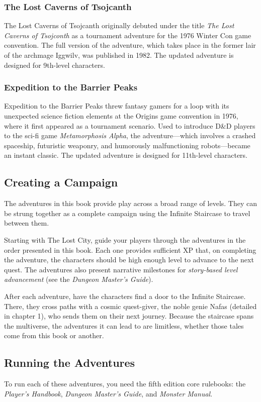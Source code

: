 \documentclass[10pt,a4paper,twoside,bg=print,twocolumn,openany,nodeprecatedcode]{dndbook}
\begin{document}
\subsubsection{The Lost Caverns of Tsojcanth}
The Lost Caverns of Tsojcanth originally debuted under the title \textit{The Lost Caverns of Tsojconth} as a tournament adventure for the 1976 Winter Con game convention. The full version of the adventure, which takes place in the former lair of the archmage Iggwilv, was published in 1982. The updated adventure is designed for 9th-level characters.

\subsubsection{Expedition to the Barrier Peaks}
Expedition to the Barrier Peaks threw fantasy gamers for a loop with its unexpected science fiction elements at the Origins game convention in 1976, where it first appeared as a tournament scenario. Used to introduce D\&D players to the sci-fi game \textit{Metamorphosis Alpha}, the adventure—which involves a crashed spaceship, futuristic weaponry, and humorously malfunctioning robots—became an instant classic. The updated adventure is designed for 11th-level characters.

\subsection{Creating a Campaign}
The adventures in this book provide play across a broad range of levels. They can be strung together as a complete campaign using the Infinite Staircase to travel between them.

Starting with The Lost City, guide your players through the adventures in the order presented in this book. Each one provides sufficient XP that, on completing the adventure, the characters should be high enough level to advance to the next quest. The adventures also present narrative milestones for \textit{story-based level advancement} (see the \textit{Dungeon Master's Guide}).

After each adventure, have the characters find a door to the Infinite Staircase. There, they cross paths with a cosmic quest-giver, the noble genie Nafas (detailed in chapter 1), who sends them on their next journey. Because the staircase spans the multiverse, the adventures it can lead to are limitless, whether those tales come from this book or another.

\subsection{Running the Adventures}
To run each of these adventures, you need the fifth edition core rulebooks: the \textit{Player's Handbook}, \textit{Dungeon Master's Guide}, and \textit{Monster Manual}.
\end{document}
